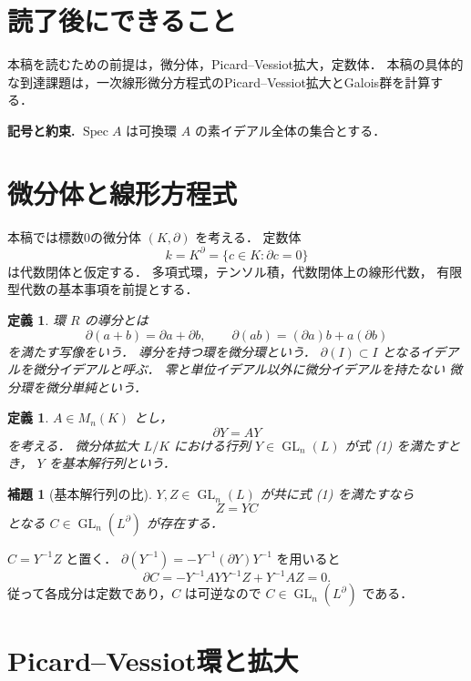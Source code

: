\documentclass[a5paper,10pt,onecolumn]{jsarticle}
\makeatletter
\theoremstyle{mathnotetheorem}
\newtheorem{definition}[theorem]{定義}
\newtheorem{lemma}[theorem]{補題}
\renewcommand{\proofname}{証明}
\renewenvironment{proof}[1][\proofname]{%
  \par\pushQED{\qed}\normalfont\topsep4\p@\@plus2\p@\relax
  \trivlist\item[\hskip\labelsep\bfseries #1]\ignorespaces
}{\popQED\endtrivlist\@endpefalse}
\makeatother
\begin{document}
\section*{読了後にできること}
本稿を読むための前提は，微分体，Picard--Vessiot拡大，定数体．
本稿の具体的な到達課題は，一次線形微分方程式のPicard--Vessiot拡大とGalois群を計算する．


\par\noindent\textbf{記号と約束.}\quad
$\operatorname{Spec}A$ は可換環 $A$ の素イデアル全体の集合とする．
\par

\section{微分体と線形方程式}

本稿では標数0の微分体 $(K,\partial)$ を考える．
定数体
\[
 k=K^\partial=\{c\in K:\partial c=0\}
\]
は代数閉体と仮定する．
多項式環，テンソル積，代数閉体上の線形代数，
有限型代数の基本事項を前提とする．

\begin{definition}
環 $R$ の導分とは
\[
 \partial(a+b)=\partial a+\partial b,\qquad
 \partial(ab)=(\partial a)b+a(\partial b)
\]
を満たす写像をいう．
導分を持つ環を微分環という．
$\partial(I)\subset I$ となるイデアルを微分イデアルと呼ぶ．
零と単位イデアル以外に微分イデアルを持たない
微分環を微分単純という．
\end{definition}

\begin{definition}
$A\in M_n(K)$ とし，
\[
 \partial Y=AY
 \tag{1}
\]
を考える．
微分体拡大 $L/K$ における行列
$Y\in\operatorname{GL}_n(L)$ が式 (1) を満たすとき，
$Y$ を基本解行列という．
\end{definition}

\begin{lemma}[基本解行列の比]\label{lem:constant-change}
$Y,Z\in\operatorname{GL}_n(L)$ が共に式 (1) を満たすなら
\[
 Z=YC
\]
となる $C\in\operatorname{GL}_n(L^\partial)$ が存在する．
\end{lemma}
\begin{proof}
$C=Y^{-1}Z$ と置く．
$\partial(Y^{-1})=-Y^{-1}(\partial Y)Y^{-1}$
を用いると
\[
 \partial C=-Y^{-1}AYY^{-1}Z+Y^{-1}AZ=0.
\]
従って各成分は定数であり，$C$ は可逆なので
$C\in\operatorname{GL}_n(L^\partial)$ である．
\end{proof}

\section{Picard--Vessiot環と拡大}
\end{document}
